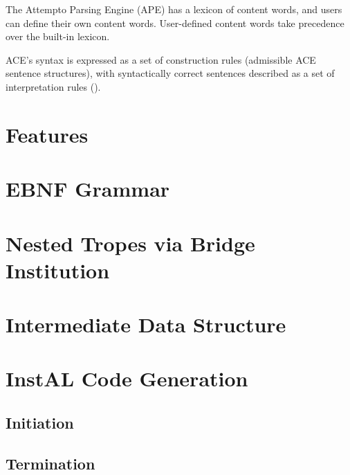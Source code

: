 The Attempto Parsing Engine (APE) has a lexicon of content words, and users can
define their own content words. User-defined content words take precedence over
the built-in lexicon.

ACE's syntax is expressed as a set of construction rules (admissible ACE
sentence structures), with syntactically
correct sentences described as a set of interpretation rules ().

\section{Features}
\label{sec:t-features}


\section{EBNF Grammar}
\label{sec:t-grammar}

\section{Nested Tropes via Bridge Institution}
\label{sec:t-nested}

\section{Intermediate Data Structure}
\label{sec:t-intermediate}

\section{InstAL Code Generation}
\label{sec:t-codegen}

\subsection{Initiation}

\subsection{Termination}

